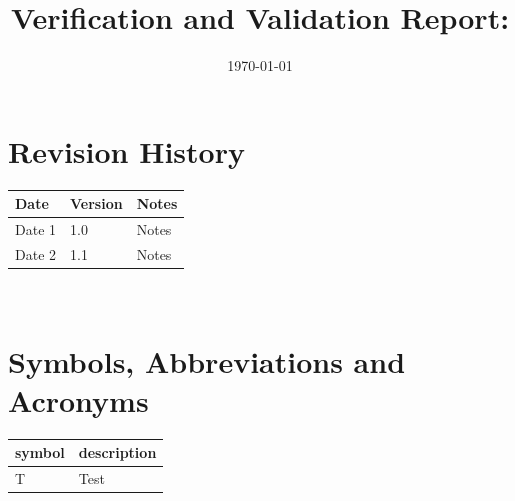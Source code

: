 \documentclass[12pt, titlepage]{article}
\begin{document}
\title{Verification and Validation Report: \progname} 
\author{\authname}
\date{\today}
	
\maketitle


\section{Revision History}

\begin{tabularx}{\textwidth}{p{3cm}p{2cm}X}
\toprule {\bf Date} & {\bf Version} & {\bf Notes}\\
\midrule
Date 1 & 1.0 & Notes\\
Date 2 & 1.1 & Notes\\
\bottomrule
\end{tabularx}

~\newpage

\section{Symbols, Abbreviations and Acronyms}

\renewcommand{\arraystretch}{1.2}
\begin{tabular}{l l} 
  \toprule		
  \textbf{symbol} & \textbf{description}\\
  \midrule 
  T & Test\\
  \bottomrule
\end{tabular}\\

\end{document}
